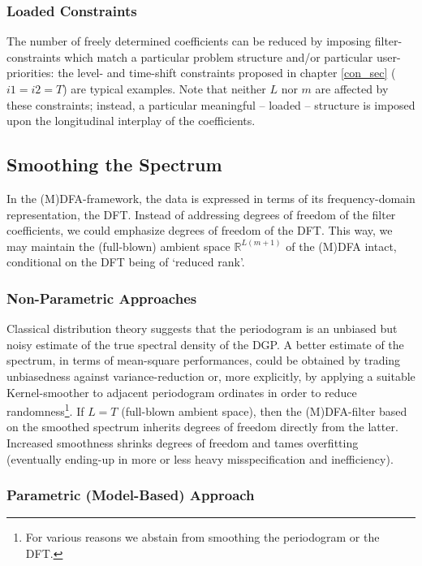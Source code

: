 \documentclass[a4paper]{book}
\begin{document}
\subsubsection{Loaded Constraints}

The number of freely determined coefficients can be reduced by imposing filter-constraints which match a particular problem structure and/or particular user-priorities: the level- and time-shift constraints proposed in chapter \ref{con_sec} ($i1=i2=T$) are typical examples. Note that neither $L$ nor $m$ are affected by these constraints; instead, a particular meaningful -- loaded -- structure is imposed upon the longitudinal interplay of the coefficients.


\subsection{Smoothing the Spectrum}



In the (M)DFA-framework, the data is expressed in terms of its frequency-domain representation, the DFT. Instead of addressing degrees of freedom of the filter coefficients, we could emphasize degrees of freedom of the DFT. This way, we may maintain the (full-blown) ambient space $\mathbb{R}^{L(m+1)}$ of the (M)DFA intact, conditional on the DFT being of `reduced rank'.   


\subsubsection{Non-Parametric Approaches}


Classical distribution theory suggests that the periodogram is an unbiased but noisy estimate of the true spectral density of the DGP. A better estimate of the spectrum, in terms of mean-square performances, could be obtained by trading unbiasedness against variance-reduction or, more explicitly, by applying a suitable Kernel-smoother to adjacent periodogram ordinates in order to reduce randomness\footnote{For various reasons we abstain from smoothing the periodogram or the DFT.}. If $L=T$ (full-blown ambient space), then the (M)DFA-filter based on the smoothed spectrum inherits degrees of freedom directly from the latter. Increased smoothness shrinks degrees of freedom and tames overfitting (eventually ending-up in more or less heavy misspecification and  inefficiency).



\subsubsection{Parametric (Model-Based) Approach}
\end{document}

